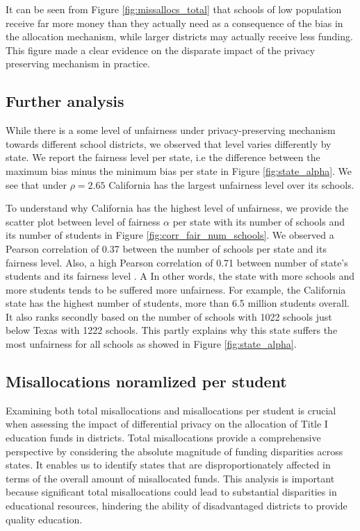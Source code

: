 \documentclass[9pt,twocolumn,twoside,lineno]{pnas-new}
\begin{document}
It can be seen from Figure \ref{fig:missallocs_total} that schools of low population receive far more money than they actually need as a consequence of the bias in the allocation mechanism, while larger districts may actually receive less funding. This figure made a clear evidence on the disparate impact of the privacy preserving mechanism in practice. 


\subsection*{Further analysis}

While there is a some level of unfairness under privacy-preserving mechanism towards different school districts,  we observed that level varies differently by state. We report the fairness level per state, i.e the difference between the maximum bias minus the minimum bias per state in Figure \ref{fig:state_alpha}. We see that under $\rho = 2.65$ California has the largest unfairness level over its schools.   

To understand why California has the highest  level of unfairness,  we provide the scatter plot between level of fairness $\alpha$ per state with its number of schools and its number of students in Figure \ref{fig:corr_fair_num_schools}. We observed a Pearson correlation of 0.37 between the number of schools per state and its fairness level. Also, a high Pearson correlation of 0.71 between number of state's students and its fairness level . A In other words, the state with more schools and more students tends to be suffered more unfairness. For example, the California state has the highest number of students, more than 6.5 million students overall. It also ranks secondly based on the number of schools with  1022 schools just below Texas with 1222 schools. This partly explains why this state suffers the most unfairness for all schools as showed in Figure \ref{fig:state_alpha}. 

\subsection*{Misallocations noramlized per student}
Examining both total misallocations and misallocations per student is crucial when assessing the impact of differential privacy on the allocation of Title I education funds in districts. Total misallocations provide a comprehensive perspective by considering the absolute magnitude of funding disparities across states. It enables us to identify states that are disproportionately affected in terms of the overall amount of misallocated funds. This analysis is important because significant total misallocations could lead to substantial disparities in educational resources, hindering the ability of disadvantaged districts to provide quality education.
\end{document}
